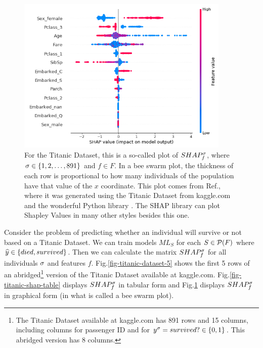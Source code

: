 \begin{enumerate}
\begin{figure}[h!]
\centering
\includegraphics[width=4in]
{shapley/titanic-shap-plot.png}
\caption{For the Titanic Dataset, 
this is a so-called
 plot of $SHAP^\sigma_f$, where
$\sigma\in \{1,2, \ldots, 891\}$
and $f\in F$.
In a bee swarm
plot, the thickness
of each row
is proportional to
how many 
individuals of the population
have that value 
of the $x$ coordinate.
This plot comes from 
Ref.\cite{maz-shap-titanic},
where it was generated using
the Titanic Dataset from kaggle.com and
the wonderful Python library .
The SHAP library can plot
Shapley Values 
in many other styles
besides this one.} 
\label{fig-titanic-shap-plot}
\end{figure}
\end{enumerate}

Consider the problem of
predicting 
whether an individual
will survive or not
based on a Titanic Dataset.
We can train models
$ML_S$ for each $S\in {\cal P}(F)$
where
${\widehat{y}}\in\{died, survived\}$.
Then we can
calculate the matrix
$SHAP^\sigma_f$
for all
individuals
$\sigma$
and features $f$.
Fig.\ref{fig-titanic-dataset-5}
shows the first 5
rows
of an abridged\footnote{The Titanic Dataset 
available at kaggle.com has 
891 rows and 15 columns,
including 
columns for passenger ID and for $y^\sigma= survived?\in \{0,1\}$.
This abridged version has 8 columns.}
\label{fig-titanic-dataset-5}
version of the Titanic Dataset
available at kaggle.com.
Fig.\ref{fig-titanic-shap-table}
displays
$SHAP^\sigma_f$ in tabular
form and Fig.\ref{fig-titanic-shap-plot}
displays $SHAP^\sigma_f$
in graphical form (in 
what is called a bee swarm plot).